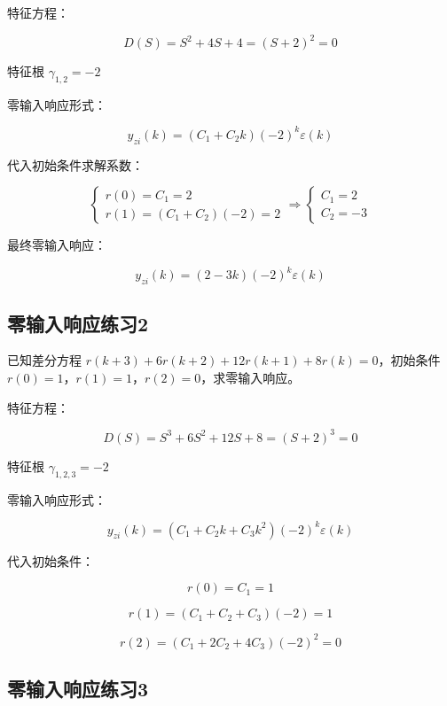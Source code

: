 \documentclass[UTF8]{ctexart}
\begin{document}
\begin{solution}
特征方程：

$$
D(S)=S^{2}+4S+4=(S+2)^{2}=0
$$

特征根 $\gamma_{1,2}=-2$

零输入响应形式：

$$
y_{zi}(k)=\left(C_{1}+C_{2}k\right)(-2)^{k}\varepsilon(k)
$$


代入初始条件求解系数：

$$
\begin{cases}
r(0)=C_{1}=2 \\
r(1)=\left(C_{1}+C_{2}\right)(-2)=2
\end{cases}
\Rightarrow
\begin{cases}
C_{1}=2 \\
C_{2}=-3
\end{cases}
$$


最终零输入响应：

$$
y_{zi}(k)=(2-3k)(-2)^{k}\varepsilon(k)
$$
\end{solution}

\subsection{零输入响应练习2}

\begin{problem}
已知差分方程 $r(k+3)+6r(k+2)+12r(k+1)+8r(k)=0$，初始条件 $r(0)=1$，$r(1)=1$，$r(2)=0$，求零输入响应。
\end{problem}

\begin{solution}
特征方程：

$$
D(S)=S^{3}+6S^{2}+12S+8=(S+2)^{3}=0
$$

特征根 $\gamma_{1,2,3}=-2$

零输入响应形式：

$$
y_{zi}(k)=\left(C_{1}+C_{2}k+C_{3}k^{2}\right)(-2)^{k}\varepsilon(k)
$$


代入初始条件：

$$
r(0)=C_{1}=1
$$


$$
r(1)=\left(C_{1}+C_{2}+C_{3}\right)(-2)=1
$$


$$
r(2)=\left(C_{1}+2C_{2}+4C_{3}\right)(-2)^{2}=0
$$
\end{solution}

\subsection{零输入响应练习3}
\end{document}
